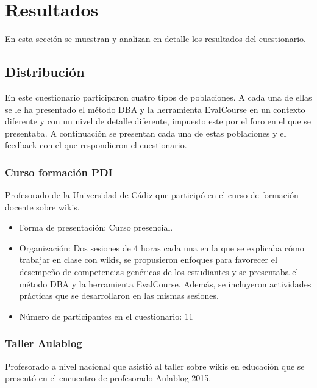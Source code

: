 \newpage

\section{Resultados} \label{apc:sec:resultados}

En esta sección se muestran y analizan en detalle los resultados del cuestionario. %

\subsection{Distribución}

En este cuestionario participaron cuatro tipos de poblaciones. A cada una de ellas se le ha presentado el método DBA y la herramienta EvalCourse en un contexto diferente y con un nivel de detalle diferente, impuesto este por el foro en el que se presentaba. A continuación se presentan cada una de estas poblaciones y el feedback con el que respondieron el cuestionario.

\subsubsection*{Curso formación PDI}
Profesorado de la Universidad de Cádiz que participó en el curso de formación docente sobre wikis.
	\begin{itemize}
		\item{Forma de presentación:} Curso presencial.

		\item{Organización:} Dos sesiones de 4 horas cada una en la que se explicaba cómo trabajar en clase con wikis, se propusieron enfoques para favorecer el desempeño de competencias genéricas de los estudiantes y se presentaba el método DBA y la herramienta EvalCourse.  Además, se incluyeron actividades prácticas que se desarrollaron en las mismas sesiones.

		\item{Número de participantes en el cuestionario:} 11
	\end{itemize}

\subsubsection*{Taller Aulablog}
Profesorado a nivel nacional que asistió al taller sobre wikis en educación que se presentó en el encuentro de profesorado Aulablog 2015.

